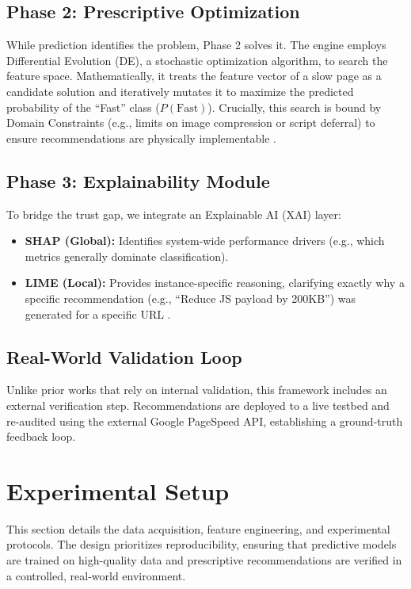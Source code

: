 \documentclass[conference]{IEEEtran}
\begin{document}
\subsection{Phase 2: Prescriptive Optimization}
While prediction identifies the problem, Phase 2 solves it. The engine employs Differential Evolution (DE), a stochastic optimization algorithm, to search the feature space. Mathematically, it treats the feature vector of a slow page as a candidate solution and iteratively mutates it to maximize the predicted probability of the ``Fast'' class ($P(\text{Fast})$). Crucially, this search is bound by Domain Constraints (e.g., limits on image compression or script deferral) to ensure recommendations are physically implementable \cite{surianarayanan2023}.

\subsection{Phase 3: Explainability Module}
To bridge the trust gap, we integrate an Explainable AI (XAI) layer:
\begin{itemize}
    \item \textbf{SHAP (Global):} Identifies system-wide performance drivers (e.g., which metrics generally dominate classification).
    \item \textbf{LIME (Local):} Provides instance-specific reasoning, clarifying exactly why a specific recommendation (e.g., ``Reduce JS payload by 200KB'') was generated for a specific URL \cite{salih2024}.
\end{itemize}

\subsection{Real-World Validation Loop}
Unlike prior works that rely on internal validation, this framework includes an external verification step. Recommendations are deployed to a live testbed and re-audited using the external Google PageSpeed API, establishing a ground-truth feedback loop.

\section{Experimental Setup}

This section details the data acquisition, feature engineering, and experimental protocols. The design prioritizes reproducibility, ensuring that predictive models are trained on high-quality data and prescriptive recommendations are verified in a controlled, real-world environment.
\end{document}
